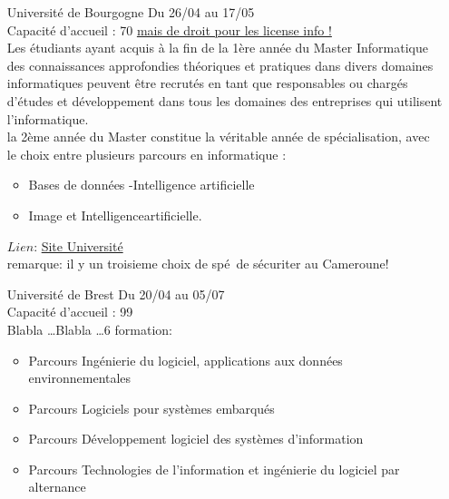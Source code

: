 \documentclass[a4paper,11pt]{article}
\newcommand{\e}{\'{e}}
\begin{document}
\begin{enumerate}
                $Lien$: \href{https://www.u-bordeaux.fr/formation/2020/PRMA_68/informatique}{Site Université}
                \\remarque: Plein de belle choses, des stat (all\e luia), et pleins de choix ! La crypto et la verification logiciel en particulier on l'air interresant.
\\
        \item [\color{LightOrangeHaf}Université de Bourgogne] Du 26/04 au 17/05
                \\Capacité d'accueil : 70  \underline{mais de droit pour les license info !}
                \\Les  étudiants  ayant  acquis  à  la  fin  de  la  1ère  année  du  Master  Informatique  des  connaissances  approfondies théoriques  et  pratiques  dans  divers  domaines  informatiques  peuvent  être  recrutés  en  tant  que  responsables ou chargés d’études et développement dans tous les domaines des entreprises qui utilisent l’informatique.\\ la 2ème année du Master constitue la véritable année de spécialisation, avec le choix entre plusieurs parcours en informatique :
                \begin{itemize}
                    \item Bases de données -Intelligence artificielle
                    \item Image et Intelligenceartificielle.
                \end{itemize}
                $Lien$: \href{https://www.u-bourgogne.fr/images/stories/odf/master/ff-informatique-m1-2.pdf}{Site Université}
                \\remarque: il y un troisieme choix de sp\e \ de s\e curiter au Cameroune!
\\
        \item [\color{LightOrangeHaf}Université de Brest] Du 20/04 au 05/07
                \\Capacité d'accueil : 99
                \\Blabla \ldots Blabla \dots 6 formation:
                \begin{itemize}
                    \item Parcours Ingénierie du logiciel, applications aux données environnementales
                    \item Parcours Logiciels pour systèmes embarqués
                    \item Parcours Développement logiciel des systèmes d'information
                    \item Parcours Technologies de l'information et ingénierie du logiciel par alternance

\end{itemize}
\end{enumerate}
\end{document}
